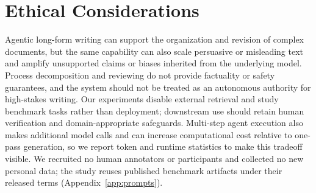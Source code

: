 \section*{Ethical Considerations}
\label{sec:ethical-considerations}

Agentic long-form writing can support the organization and revision of complex documents, but the same capability can also scale persuasive or misleading text and amplify unsupported claims or biases inherited from the underlying model.
Process decomposition and reviewing do not provide factuality or safety guarantees, and the system should not be treated as an autonomous authority for high-stakes writing.
Our experiments disable external retrieval and study benchmark tasks rather than deployment; downstream use should retain human verification and domain-appropriate safeguards.
Multi-step agent execution also makes additional model calls and can increase computational cost relative to one-pass generation, so we report token and runtime statistics to make this tradeoff visible.
We recruited no human annotators or participants and collected no new personal data; the study reuses published benchmark artifacts under their released terms (Appendix~\ref{app:prompts}).
